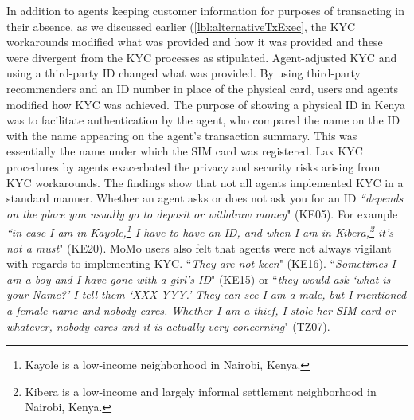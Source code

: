  In addition to agents keeping customer information for purposes of transacting in their absence, as we discussed earlier (\ref{lbl:alternativeTxExec}, the KYC workarounds modified what was provided and how it was provided and these were divergent from the KYC processes as stipulated. Agent-adjusted KYC and using a third-party ID changed what was provided. By using third-party recommenders and an ID number in place of the physical card, users and agents modified how KYC was achieved. The purpose of showing a physical ID in Kenya was to facilitate authentication by the agent, who compared the name on the ID with the name appearing on the agent's transaction summary. This was essentially the name under which the SIM card was registered. Lax KYC procedures by agents exacerbated the privacy and security risks arising from KYC workarounds. The findings show that not all agents implemented KYC in a standard manner. Whether an agent asks or does not ask you for an ID \textit{``depends on the place you usually go to deposit or withdraw money}" (KE05). For example \textit{``in case I am in Kayole,\footnote{Kayole is a low-income neighborhood in Nairobi, Kenya.} I have to have an ID, and when I am in Kibera,\footnote{Kibera is a low-income and largely informal settlement neighborhood in Nairobi, Kenya.} it’s not a must}" (KE20). MoMo users also felt that agents were not always vigilant with regards to implementing KYC. ``\textit{They are not keen}" (KE16). ``\textit{Sometimes I am a boy and I have gone with a girl’s ID}" (KE15) or ``\textit{they would ask `what is your Name?’ I tell them ‘XXX YYY.' They can see I am a male, but I mentioned a female name and nobody cares. Whether I am a thief, I stole her SIM card or whatever, nobody cares and it is actually very concerning}" (TZ07).

